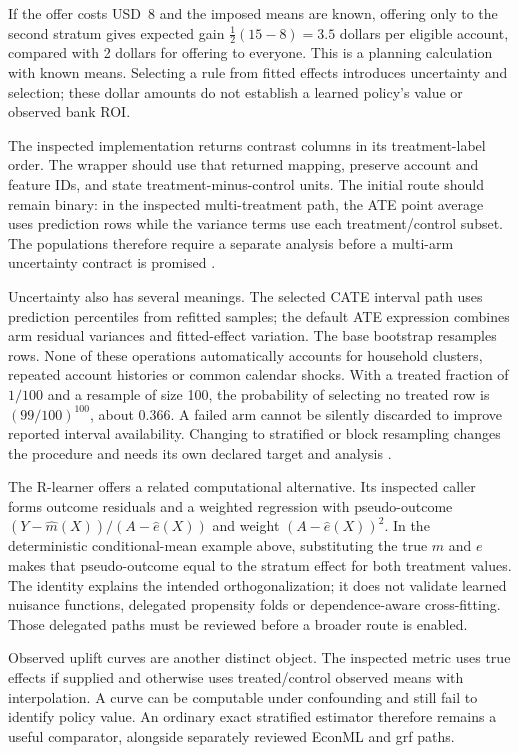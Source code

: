 If the offer costs USD~8 and the imposed means are known, offering only to the
second stratum gives expected gain $\tfrac12(15-8)=3.5$ dollars per eligible
account, compared with 2 dollars for offering to everyone. This is a planning
calculation with known means. Selecting a rule from fitted effects introduces
uncertainty and selection; these dollar amounts do not establish a learned
policy's value or observed bank ROI.

The inspected implementation returns contrast columns in its treatment-label
order. The wrapper should use that returned mapping, preserve account and
feature IDs, and state treatment-minus-control units. The initial route should
remain binary: in the inspected multi-treatment path, the ATE point average
uses prediction rows while the variance terms use each treatment/control
subset. The populations therefore require a separate analysis before a
multi-arm uncertainty contract is promised \citep{exec14_causalml_primary}.

Uncertainty also has several meanings. The selected CATE interval path uses
prediction percentiles from refitted samples; the default ATE expression
combines arm residual variances and fitted-effect variation. The base bootstrap
resamples rows. None of these operations automatically accounts for household
clusters, repeated account histories or common calendar shocks. With a treated
fraction of $1/100$ and a resample of size 100, the probability of selecting
no treated row is $(99/100)^{100}$, about 0.366. A failed arm cannot be silently
discarded to improve reported interval availability. Changing to stratified
or block resampling changes the procedure and needs its own declared target
and analysis \citep{exec14_causalml_primary,exec14_causalml_oracle}.

The R-learner offers a related computational alternative. Its inspected caller
forms outcome residuals and a weighted regression with pseudo-outcome
$(Y-\widehat m(X))/(A-\widehat e(X))$ and weight
$(A-\widehat e(X))^2$. In the deterministic conditional-mean example above,
substituting the true $m$ and $e$ makes that pseudo-outcome equal to the stratum
effect for both treatment values. The identity explains the intended
orthogonalization; it does not validate learned nuisance functions, delegated
propensity folds or dependence-aware cross-fitting. Those delegated paths
must be reviewed before a broader route is enabled.

Observed uplift curves are another distinct object. The inspected metric
uses true effects if supplied and otherwise uses treated/control observed
means with interpolation. A curve can be computable under confounding and
still fail to identify policy value. An ordinary exact stratified estimator
therefore remains a useful comparator, alongside separately reviewed EconML
and grf paths.

